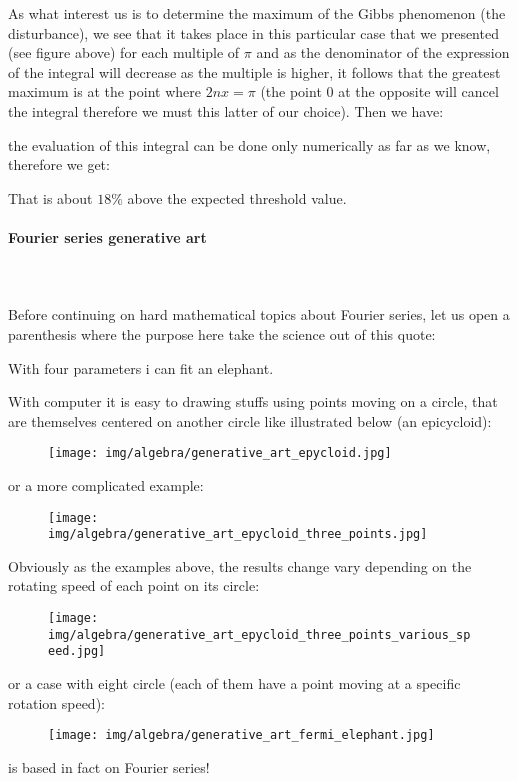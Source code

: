	As what interest us is to determine the maximum of the Gibbs phenomenon (the disturbance), we see that it takes place in this particular case that we presented (see figure above) for each multiple of $\pi$ and as the denominator of the expression of the integral will decrease as the multiple is higher, it follows that the greatest maximum is at the point where $2nx=\pi$  (the point $0$ at the opposite will cancel the integral therefore we must this latter of our choice). Then we have:
	
	the evaluation of this integral can be done only numerically as far as we know, therefore we get:
	
	That is about $18\%$ above the expected threshold value.
	
	\paragraph{Fourier series generative art}\mbox{}\\\\
	Before continuing on hard mathematical topics about Fourier series, let us open a parenthesis where the purpose here take the science out of this quote:
	\begin{fquote}With four parameters i can fit an elephant.
 	\end{fquote}
 	With computer it is easy to drawing stuffs using points moving on a circle, that are themselves centered on another circle like illustrated below (an epicycloid):
 	\begin{figure}[H]
		\centering
		\texttt{[image: img/algebra/generative\_art\_epycloid.jpg]}
	\end{figure}
	or a more complicated example:
	\begin{figure}[H]
		\centering
		\texttt{[image: img/algebra/generative\_art\_epycloid\_three\_points.jpg]}
	\end{figure}
	Obviously as the examples above, the results change vary depending on the rotating speed of each point on its circle:
	\begin{figure}[H]
		\centering
		\texttt{[image: img/algebra/generative\_art\_epycloid\_three\_points\_various\_speed.jpg]}
	\end{figure}
	or a case with eight circle (each of them have a point moving at a specific rotation speed):
	\begin{figure}[H]
		\centering
		\texttt{[image: img/algebra/generative\_art\_fermi\_elephant.jpg]}
	\end{figure}
 	is based in fact on Fourier series!
 	
